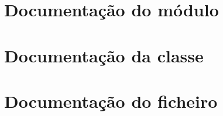 \documentclass[twoside]{book}
\begin{document}
\chapter{Documentação do módulo}







\chapter{Documentação da classe}



\chapter{Documentação do ficheiro}















\newpage
{}
{}
\printindex
\end{document}
